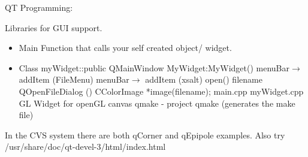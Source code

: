QT Programming:

Libraries for GUI support.  
\begin{itemize}
\item Main Function that calls your self created object/ widget.
\item Class myWidget::public QMainWindow
	MyWidget:MyWidget()
	{
		menuBar$\to$ addItem (FileMenu)
		menuBar$\to$ addItem (xsalt)	
	}
	open()
	{
		filename QOpenFileDialog ()
		CColorImage *image(filename);
	}
	main.cpp
	myWidget.cpp
	GL Widget for openGL
	canvas
	qmake - project 
	qmake  (generates the make file)
		
\end{itemize}
		In the CVS system there are both qCorner and qEpipole examples.  Also try /usr/share/doc/qt-devel-3/html/index.html
		

